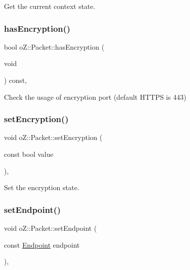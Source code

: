 Get the current context\textquotesingle{} state. 

\mbox{\label{classo_z_1_1_packet_abf9bd4979afb439272832d5a90f7d556}} 
\subsubsection{\texorpdfstring{hasEncryption()}{hasEncryption()}}
{\footnotesize\ttfamily bool o\+Z\+::\+Packet\+::has\+Encryption (\begin{DoxyParamCaption}\item[{void}]{ }\end{DoxyParamCaption}) const\hspace{0.3cm}{\ttfamily [inline]}, {\ttfamily [noexcept]}}



Check the usage of encryption port (default H\+T\+T\+PS is 443) 

\mbox{\label{classo_z_1_1_packet_a7c6fc3f9ca25adf83be8e7c1f5ae5b70}} 
\subsubsection{\texorpdfstring{setEncryption()}{setEncryption()}}
{\footnotesize\ttfamily void o\+Z\+::\+Packet\+::set\+Encryption (\begin{DoxyParamCaption}\item[{const bool}]{value }\end{DoxyParamCaption})\hspace{0.3cm}{\ttfamily [inline]}, {\ttfamily [noexcept]}}



Set the encryption state. 

\mbox{\label{classo_z_1_1_packet_a2bcd9f2d612cbc1b59a8b7c99d706908}} 
\subsubsection{\texorpdfstring{setEndpoint()}{setEndpoint()}}
{\footnotesize\ttfamily void o\+Z\+::\+Packet\+::set\+Endpoint (\begin{DoxyParamCaption}\item[{const \mbox{\hyperlink{classo_z_1_1_endpoint}{Endpoint}}}]{endpoint }\end{DoxyParamCaption})\hspace{0.3cm}{\ttfamily [inline]}, {\ttfamily [noexcept]}}



